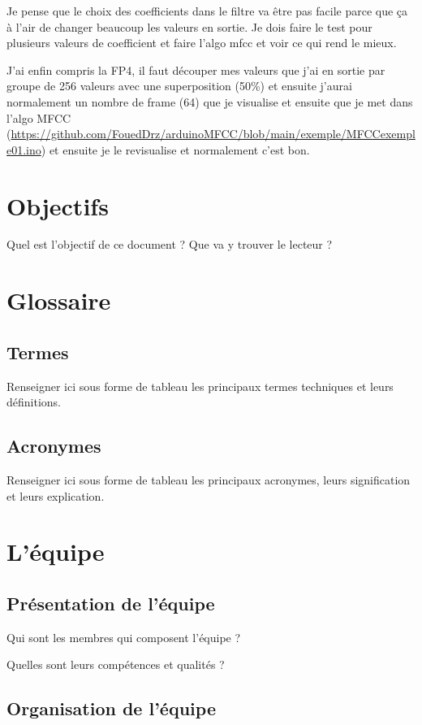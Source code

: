 \documentclass[a4paper,11pt]{article}
\begin{document}
Je pense que le choix des coefficients dans le filtre va être pas facile parce que ça à l'air de changer beaucoup les valeurs en sortie. Je dois faire le test pour plusieurs valeurs de coefficient et faire l'algo mfcc et voir ce qui rend le mieux.

J'ai enfin compris la FP4, il faut découper mes valeurs que j'ai en sortie par groupe de 256 valeurs avec une superposition (50\%) et ensuite j'aurai normalement un nombre de frame (64) que je visualise et ensuite que je met dans l'algo MFCC (\url{https://github.com/FouedDrz/arduinoMFCC/blob/main/exemple/MFCCexemple01.ino}) et ensuite je le revisualise et normalement c'est bon.

\section{Objectifs}
Quel est l’objectif de ce document ?
Que va y trouver le lecteur ?
	
\section{Glossaire}
\subsection{Termes}
Renseigner ici sous forme de tableau les principaux termes techniques et leurs définitions.
			
\subsection{Acronymes}
		
Renseigner ici sous forme de tableau les principaux acronymes, leurs signification et leurs explication.
			
\section{L'équipe}
\subsection{Présentation de l’équipe}
			
Qui sont les membres qui composent l’équipe ?
			
Quelles sont leurs compétences et qualités ?
			
\subsection{Organisation de l’équipe}
			
\end{document}
